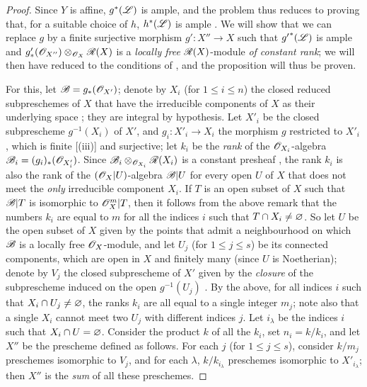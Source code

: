 \begin{proof}
Since $Y$ is affine, $g^*(\mathscr{L})$ is ample, and the problem thus reduces to proving that, for a suitable choice of $h$, $h^*(\mathscr{L})$ is ample .
We will show that we can replace $g$ by a finite surjective morphism $g':X''\to X$ such that ${g'}^*(\mathscr{L})$ is ample and $g'_*(\mathscr{O}_{X''})\otimes_{\mathscr{O}_X}\mathscr{R}(X)$ is a \emph{locally free} $\mathscr{R}(X)$-module \emph{of constant rank};
we will then have reduced to the conditions of , and the proposition will thus be proven.

For this, let $\mathscr{B}=g_*(\mathscr{O}_{X'})$;
denote by $X_i$ (for $1\leq i\leq n$) the closed reduced subpreschemes of $X$ that have the irreducible components of $X$ as their underlying space ;
they are integral by hypothesis.
Let $X'_i$ be the closed subprescheme $g^{-1}(X_i)$ of $X'$, and $g_i:X'_i\to X_i$ the morphism $g$ restricted to $X'_i$, which is finite [(iii)] and surjective;
let $k_i$ be the \emph{rank} of the $\mathscr{O}_{X_i}$-algebra $\mathscr{B}_i=(g_i)_*(\mathscr{O}_{X'_i})$.
Since $\mathscr{B}_i\otimes_{\mathscr{O}_{X_i}}\mathscr{R}(X_i)$ is a constant presheaf , the rank $k_i$ is also the rank of the $(\mathscr{O}_X|U)$-algebra $\mathscr{B}|U$ for every open $U$ of $X$ that does not meet the \emph{only} irreducible component $X_i$.
If $T$ is an open subset of $X$ such that $\mathscr{B}|T$ is isomorphic to $\mathscr{O}_X^m|T$, then it follows from the above remark that the numbers $k_i$ are equal to $m$ for all the indices $i$ such that $T\cap X_i\neq\varnothing$.
So let $U$ be the open subset of $X$ given by the points that admit a neighbourhood on which $\mathscr{B}$ is a locally free $\mathscr{O}_X$-module, and let $U_j$ (for $1\leq j\leq s$) be its connected components, which are open in $X$ and finitely many (since $U$ is Noetherian);
denote by $V_j$ the closed subprescheme of $X'$ given by the \emph{closure} of the subprescheme induced on the open $g^{-1}(U_j)$ .
By the above, for all indices $i$ such that $X_i\cap U_j\neq\varnothing$, the ranks $k_i$ are all equal to a single integer $m_j$;
note also that a single $X_i$ cannot meet two $U_j$ with different indices $j$.
Let $i_\lambda$ be the indices $i$ such that $X_i\cap U=\varnothing$.
Consider the product $k$ of all the $k_i$, set $n_i=k/k_i$, and let $X''$ be the prescheme defined as follows.
For each $j$ (for $1\leq j\leq s$), consider $k/m_j$ preschemes isomorphic to $V_j$, and for each $\lambda$, $k/k_{i_\lambda}$ preschemes isomorphic to $X'_{i_\lambda}$;
then $X''$ is the \emph{sum} of all these preschemes.

\end{proof}
